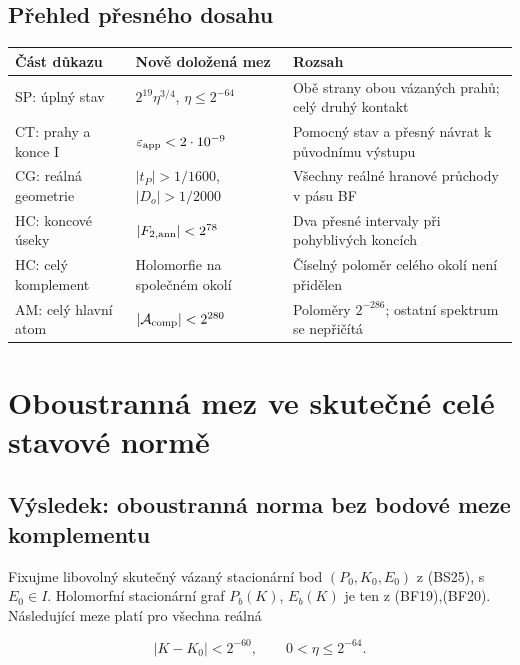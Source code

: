 \documentclass[11pt,a4paper]{article}
\theoremstyle{remark}\newtheorem{remark}[theorem]{Poznámka}
\numberwithin{equation}{section}
\begin{document}
\subsection{Přehled přesného dosahu}

\begin{center}
\small
\begin{tabular}{>{\raggedright\arraybackslash}p{41mm}>{\raggedright\arraybackslash}p{49mm}>{\raggedright\arraybackslash}p{61mm}}
\toprule
Část důkazu & Nově doložená mez & Rozsah\\
\midrule
SP: úplný stav & \(2^{19}\eta^{3/4}\), \(\eta\le2^{-64}\) &
Obě strany obou vázaných prahů; celý druhý kontakt\\[3pt]
CT: prahy a konce I & \(\varepsilon_{\rm app}<2\cdot10^{-9}\) &
Pomocný stav a přesný návrat k původnímu výstupu\\[3pt]
CG: reálná geometrie & \(|t_P|>1/1600\), \(|D_o|>1/2000\) &
Všechny reálné hranové průchody v pásu BF\\[3pt]
HC: koncové úseky & \(|F_{2,\rm ann}|<2^{78}\) &
Dva přesné intervaly při pohyblivých koncích\\[3pt]
HC: celý komplement & Holomorfie na společném okolí &
Číselný poloměr celého okolí není přidělen\\[3pt]
AM: celý hlavní atom & \(|\mathcal A_{\rm comp}|<2^{280}\) &
Poloměry \(2^{-286}\); ostatní spektrum se nepřičítá\\
\bottomrule
\end{tabular}
\end{center}

\clearpage
\section{Oboustranná mez ve skutečné celé stavové normě}
\hypertarget{vuxfdsledek-oboustrannuxe1-norma-bez-bodovuxe9-meze-komplementu}{%
\subsection{Výsledek: oboustranná norma bez bodové meze
komplementu}\label{vuxfdsledek-oboustrannuxe1-norma-bez-bodovuxe9-meze-komplementu}}

Fixujme libovolný skutečný vázaný stacionární bod \((P_0,K_0,E_0)\) z
(BS25), s \(E_0\in I\). Holomorfní stacionární graf \(P_b(K)\),
\(E_b(K)\) je ten z (BF19),(BF20). Následující meze platí pro všechna
reálná

\[
|K-K_0|<2^{-60},\qquad 0<\eta\le2^{-64}.
\tag{SP1}
\]
\end{document}
